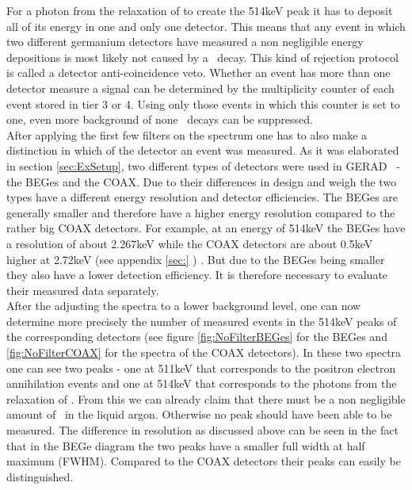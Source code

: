 \documentclass[encoding=utf8,british]{tumphthesis}
\begin{document}
For a photon from the relaxation of  to create the 514keV peak it has to deposit all of its energy in one and only one detector. 
This means that any event in which two different germanium detectors have measured a non negligible energy depositions is most likely not caused by a \Kr\ decay.
This kind of rejection protocol is called a detector anti-coincidence veto.
Whether an event has more than one detector measure a signal can be determined by the multiplicity counter of each event stored in tier 3 or 4.
Using only those events in which this counter is set to one, even more background of none \Kr\ decays can be suppressed.
\\

After applying the first few filters on the spectrum one has to also make a distinction in which of the detector an event was measured.
As it was elaborated in section \ref{sec:ExSetup}, two different types of detectors were used in GERAD \PII\ - the BEGes  and the COAX. 
Due to their differences in design and weigh the two types have a different energy resolution and detector efficiencies. 
The BEGes are generally smaller and therefore have a higher energy resolution compared to the rather big COAX detectors.
For example, at an energy of 514keV the BEGes have a resolution of about 2.267keV while the COAX detectors are about 0.5keV higher at 2.72keV (see appendix \ref{sec:} ) \cite{agostini_background_2017}. 
But due to the BEGes being smaller they also have a lower detection efficiency.
It is therefore necessary to evaluate their measured data separately.
\\

After the adjusting the spectra to a lower background level, one can now determine more precisely the number of measured events in the 514keV peaks of the corresponding detectors (see figure \ref{fig:NoFilterBEGes} for the BEGes and \ref{fig:NoFilterCOAX} for the spectra of the COAX detectors). 
In these two spectra one can see two peaks - one at 511keV that corresponds to the positron electron annihilation events and one at 514keV that corresponds to the photons from the relaxation of .
From this we can already claim that there must be a non negligible amount of \Kr\ in the liquid argon.
Otherwise no peak should have been able to be measured. 
The difference in resolution as discussed above can be seen in the fact that in the BEGe diagram the two peaks have a smaller full width at half maximum (FWHM).
Compared to the COAX detectors their peaks can easily be distinguished.  
\\
\end{document}
